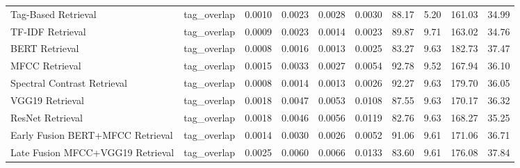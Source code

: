 \documentclass[sigconf]{acmart}
\begin{document}
\begin{landscape}
\begin{table}[H]
\begin{tabularx}{\linewidth}{l l *{8}{Y}}
        Tag-Based Retrieval & tag\_overlap & 0.0010 & 0.0023 & 0.0028 & 0.0030 & 88.17 & 5.20 & 161.03 & 34.99 \\
        TF-IDF Retrieval & tag\_overlap & 0.0009 & 0.0023 & 0.0014 & 0.0023 & 89.87 & 9.71 & 163.02 & 34.76 \\
        BERT Retrieval & tag\_overlap & 0.0008 & 0.0016 & 0.0013 & 0.0025 & 83.27 & 9.63 & 182.73 & 37.47 \\
        MFCC Retrieval & tag\_overlap & 0.0015 & 0.0033 & 0.0027 & 0.0054 & 92.78 & 9.52 & 167.94 & 36.10 \\
        Spectral Contrast Retrieval & tag\_overlap & 0.0008 & 0.0014 & 0.0013 & 0.0026 & 92.27 & 9.63 & 179.70 & 36.05 \\
        VGG19 Retrieval & tag\_overlap & 0.0018 & 0.0047 & 0.0053 & 0.0108 & 87.55 & 9.63 & 170.17 & 36.32 \\
        ResNet Retrieval & tag\_overlap & 0.0018 & 0.0046 & 0.0056 & 0.0119 & 82.76 & 9.63 & 168.27 & 35.25 \\
        Early Fusion BERT+MFCC Retrieval & tag\_overlap & 0.0014 & 0.0030 & 0.0026 & 0.0052 & 91.06 & 9.61 & 171.06 & 36.71 \\
        Late Fusion MFCC+VGG19 Retrieval & tag\_overlap & 0.0025 & 0.0060 & 0.0066 & 0.0133 & 83.60 & 9.61 & 176.08 & 37.84 \\
        \bottomrule
    \end{tabularx}
\end{table}
\end{landscape}
\end{document}
